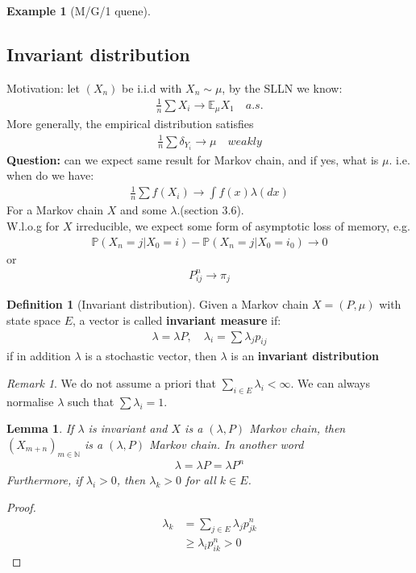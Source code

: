 \documentclass[a4paper,11pt]{book}
\newtheorem{lemma}[theorem]{Lemma}
\theoremstyle{definition}
\newtheorem{definition}{Definition}[section]
\newtheorem*{example}{Example}
\theoremstyle{remark}
\newtheorem*{remark}{Remark}
\begin{document}
\begin{example}[M/G/1 quene]
	
\end{example}



\subsection{Invariant distribution}
Motivation: let $(X_n)$ be i.i.d with $X_n \sim \mu$, by the SLLN we know:
\begin{align*}
	\frac{1}{n} \sum X_i \rightarrow \mathbb{E}_\mu X_1 \quad a.s.
\end{align*}
More generally, the empirical distribution satisfies 
\begin{align*}
	\frac{1}{n} \sum \delta_{Y_i} \rightarrow \mu \quad weakly
\end{align*}
\textbf{Question:} can we expect same result for Markov chain, and if yes, what is $\mu$. i.e. when do we have:
\begin{align*}
	\frac{1}{n} \sum f(X_i) \rightarrow \int f(x) \lambda(dx)
\end{align*}
For a Markov chain $X$ and some $\lambda$.(section 3.6).\\
W.l.o.g for $X$ irreducible, we expect some form of asymptotic loss of memory, e.g.
\begin{align*}
	\mathbb{P}(X_n = j| X_0 = i) - \mathbb{P}(X_n = j| X_0 = i_0) \rightarrow 0
\end{align*}
or 
\begin{align*}
	P_{ij}^n \rightarrow \pi_j
\end{align*}
\begin{definition}[Invariant distribution]
	Given a Markov chain $X = (P, \mu)$ with state space $E$, a vector is called \textbf{invariant measure} if:
	\begin{align*}
		\lambda = \lambda P, \quad \lambda_i = \sum \lambda_j p_{ij}
	\end{align*}
	if in addition $\lambda$ is a stochastic vector, then $\lambda$ is an \textbf{invariant distribution}
\end{definition}
\begin{remark}
We do not assume a priori that $\sum_{i \in E} \lambda_i< \infty$. We can always normalise $\lambda$ such that $\sum \lambda_i = 1$.	
\end{remark}

\begin{lemma}
	If $\lambda$ is invariant and $X$ is a $(\lambda, P)$ Markov chain, then $(X_{m+n})_{m \in \mathbb{N}}$ is a $(\lambda, P)$ Markov chain. In another word
	\begin{align*}
		\lambda = \lambda P = \lambda P^n
	\end{align*}
	Furthermore, if $\lambda_i > 0$, then $\lambda_k > 0$ for all $k \in E$.
\end{lemma}
\begin{proof}
	\begin{align*}
		\lambda_k &= \sum_{j \in E} \lambda_j p_{jk}^n\\
		&\ge \lambda_i p_{ik}^n > 0
	\end{align*}
\end{proof}
\end{document}
